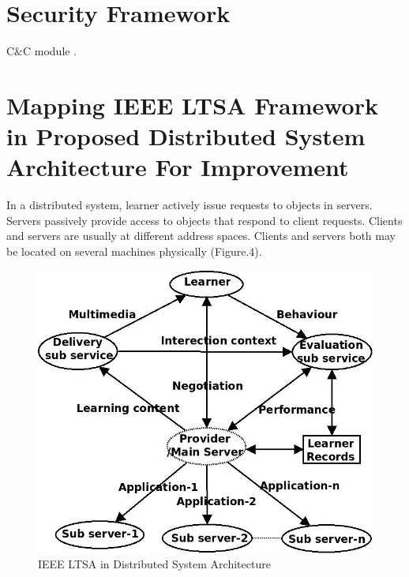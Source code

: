 \section{Security Framework}
 \blindtext C\&C module \cite{cc}.

\section{Mapping IEEE LTSA Framework in Proposed Distributed System Architecture For Improvement}
In a distributed system, learner actively issue requests to objects in servers. Servers
passively provide access to objects that respond to client requests. Clients and
servers are usually at different address spaces. Clients and servers both may be
located on several machines physically (Figure.4). 
\begin{figure}[h!]
 \centering
 \includegraphics[scale=.5]{ds2.jpeg}
 \caption{IEEE LTSA in Distributed System Architecture}
\end{figure}

